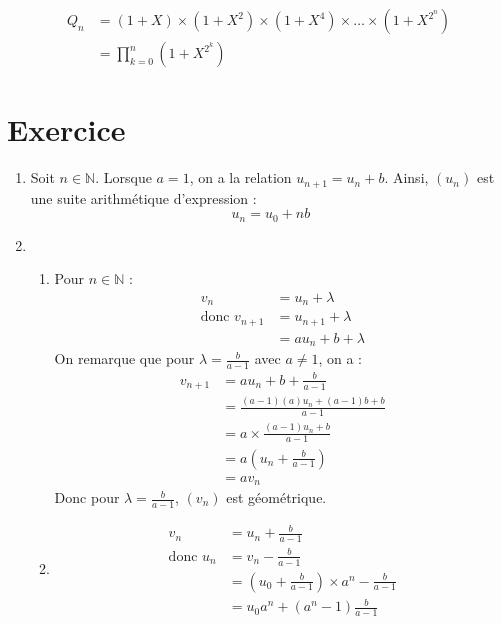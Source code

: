 \documentclass{report}
\begin{document}
\begin{align*}
    Q_n &= (1+X) \times (1+X^2) \times (1+X^4) \times \dots \times (1+X^{2^n}) \\
    &= \prod_{k=0}^{n} (1 + X^{2^k})
\end{align*}

\setcounter{chapter}{14}
\setcounter{section}{5}
\section{Exercice}

\begin{enumerate}
    \item Soit $n \in \mathbb{N}$. Lorsque $a = 1$, on a la relation $u_{n+1} = u_n + b$. 
    Ainsi, $(u_n)$ est une suite arithmétique d'expression : 
    $$u_n = u_0 + nb$$

    \item \begin{enumerate}
        \item Pour $n \in \mathbb{N}$ : 
        \begin{align*}
            v_n &= u_n + \lambda \\
            \text{donc } v_{n+1} &= u_{n+1} + \lambda \\
            &= a u_{n} + b + \lambda
        \end{align*}
        On remarque que pour $\lambda = \frac{b}{a-1}$ avec $a \neq 1$, on a :
        \begin{align*}
            v_{n+1} &= a u_n + b + \frac{b}{a - 1} \\
            &= \frac{(a-1) (a) u_n + (a-1)b + b}{a - 1} \\
            &= a \times \frac{(a-1) u_n + b}{a-1} \\
            &= a \left( u_n + \frac{b}{a - 1} \right) \\
            &= a v_n
        \end{align*}
        Donc pour $\lambda = \frac{b}{a-1}$, $(v_n)$ est géométrique. 

        \item \begin{align*}
            v_n &= u_n + \frac{b}{a-1} \\
            \text{donc } u_n &= v_n - \frac{b}{a-1} \\
            &= \left( u_0 + \frac{b}{a-1} \right) \times a^n - \frac{b}{a-1} \\
            &= u_0 a^n + (a^n - 1) \frac{b}{a-1}
        \end{align*}
    \end{enumerate}
\end{enumerate}
\end{document}
